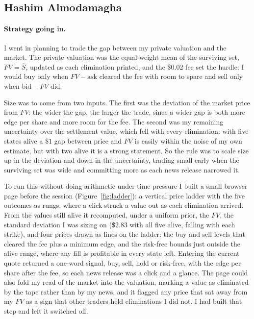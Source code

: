 
\subsection{Hashim Almodamagha}

\paragraph{Strategy going in.}
I went in planning to trade the gap between my private valuation and the market.
The private valuation was the equal-weight mean of the surviving set, $FV = \overline{S}$,
updated as each elimination printed, and the $\$0.02$ fee set the hurdle: I would buy
only when $FV - \text{ask}$ cleared the fee with room to spare and sell only when
$\text{bid} - FV$ did.

Size was to come from two inputs. The first was the deviation of the market price from
$FV$: the wider the gap, the larger the trade, since a wider gap is both more edge per
share and more room for the fee. The second was my remaining uncertainty over the
settlement value, which fell with every elimination: with five states alive a $\$1$ gap
between price and $FV$ is easily within the noise of my own estimate, but with two alive
it is a strong statement. So the rule was to scale size up in the deviation and down in
the uncertainty, trading small early when the surviving set was wide and committing
more as each news release narrowed it.

To run this without doing arithmetic under time pressure I built a small browser page
before the session (Figure~\ref{fig:ladder}): a vertical price ladder with the five
outcomes as rungs, where a click struck a value out as each elimination arrived. From the values still alive it
recomputed, under a uniform prior, the $FV$, the standard deviation I was sizing on
($\$2.83$ with all five alive, falling with each strike), and four prices drawn as
lines on the ladder: the buy and sell levels that cleared the fee plus a minimum edge,
and the risk-free bounds just outside the alive range, where any fill is profitable in
every state left. Entering the current quote returned a one-word signal, buy, sell,
hold or risk-free, with the edge per share after the fee, so each news release was a
click and a glance. The page could also fold my read of the market into the valuation,
marking a value as eliminated by the tape rather than by my news, and it flagged any
price that sat away from my $FV$ as a sign that other traders held eliminations I did
not. I had built that step and left it switched off.

